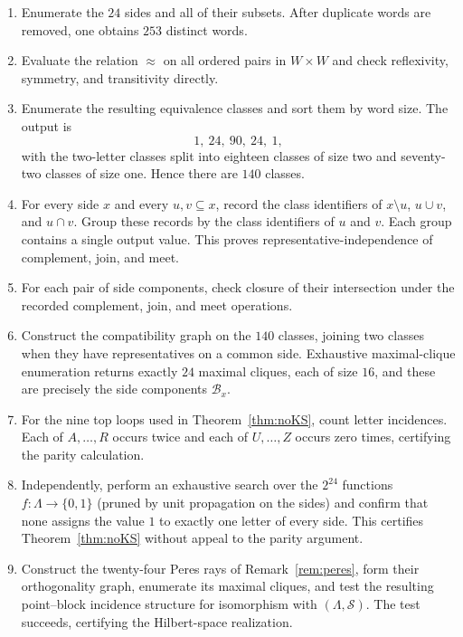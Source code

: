 \documentclass{article}   	%
\theoremstyle{plain}
\theoremstyle{definition}
\theoremstyle{remark}
\begin{document}
\begin{enumerate}
\item Enumerate the $24$ sides and all of their subsets.  After duplicate words
      are removed, one obtains $253$ distinct words.
\item Evaluate the relation $\approx$ on all ordered pairs in $W\times W$ and
      check reflexivity, symmetry, and transitivity directly.
\item Enumerate the resulting equivalence classes and sort them by word size.
      The output is
      \[
      1,\ 24,\ 90,\ 24,\ 1,
      \]
      with the two-letter classes split into eighteen classes of size two and
      seventy-two classes of size one.  Hence there are $140$ classes.
\item For every side $x$ and every $u,v\subseteq x$, record the class identifiers
      of $x\setminus u$, $u\cup v$, and $u\cap v$.  Group these records by the
      class identifiers of $u$ and $v$.  Each group contains a single output
      value.  This proves representative-independence of complement, join, and
      meet.
\item For each pair of side components, check closure of their intersection
      under the recorded complement, join, and meet operations.
\item Construct the compatibility graph on the $140$ classes, joining two
      classes when they have representatives on a common side.  Exhaustive
      maximal-clique enumeration returns exactly $24$ maximal cliques, each of
      size $16$, and these are precisely the side components $\mathcal B_x$.
\item For the nine top loops used in Theorem~\ref{thm:noKS}, count letter
      incidences.  Each of $A,\ldots,R$ occurs twice and each of
      $U,\ldots,Z$ occurs zero times, certifying the parity calculation.
\item Independently, perform an exhaustive search over the $2^{24}$ functions
      $f:\Lambda\to\{0,1\}$ (pruned by unit propagation on the sides) and
      confirm that none assigns the value $1$ to exactly one letter of every
      side.  This certifies Theorem~\ref{thm:noKS} without appeal to the parity
      argument.
\item Construct the twenty-four Peres rays of Remark~\ref{rem:peres}, form
      their orthogonality graph, enumerate its maximal cliques, and test the
      resulting point--block incidence structure for isomorphism with
      $(\Lambda,\mathcal S)$.  The test succeeds, certifying the Hilbert-space
      realization.
\end{enumerate}
\end{document}

